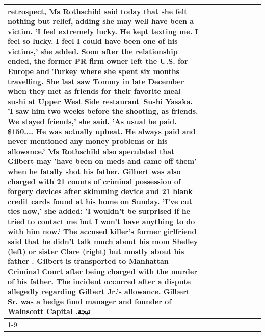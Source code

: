 \begin{table}[H]
\begin{tabular}{lllrlllll}
retrospect, Ms Rothschild said today that she felt nothing but relief, adding she may well have been a victim. 'I feel extremely lucky. He kept texting me. I feel so lucky. I feel I could have been one of his victims,' she added. Soon after the relationship ended, the former PR firm owner left the U.S. for Europe and Turkey where she spent six months  travelling. She last saw Tommy in late December when they met as friends for their favorite meal sushi at Upper West Side restaurant Sushi Yasaka. 'I saw him two weeks before the shooting, as friends. We stayed friends,' she said. 'As usual he paid. \$150.... He was actually upbeat. He always paid and never mentioned any money problems or his allowance.' Ms Rothschild also speculated that Gilbert may 'have been on meds and came off them' when he fatally shot his father. Gilbert was also charged with 21 counts of criminal possession of forgery devices after skimming device and 21 blank credit cards found at his home on Sunday. 'I've cut ties now,' she added: 'I wouldn’t be surprised if he tried to contact me but I won’t have anything to do with him now.' The accused killer's former girlfriend said that he didn't talk much about his mom Shelley (left) or sister Clare (right) but mostly about his father . Gilbert is transported to Manhattan Criminal Court  after being charged with the murder of his father. The incident occurred after a dispute allegedly regarding Gilbert Jr.'s allowance. Gilbert Sr. was a hedge fund manager and founder of Wainscott Capital .تيجة \\
\cline{1-9} \cline{2-9}

\end{tabular}
\end{table}
